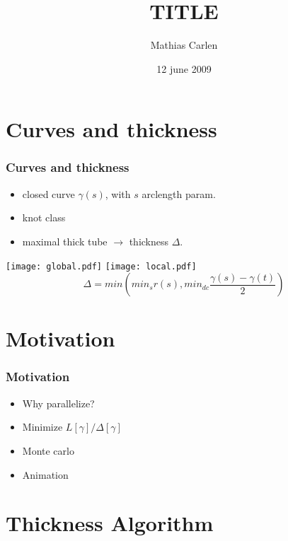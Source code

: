 \documentclass{beamer}
\title{TITLE}
\author{Mathias Carlen}
\date{12 june 2009}
\begin{document}
\frame{\titlepage}


\section{Curves and thickness}

\begin{frame}
\frametitle{Curves and thickness}

\begin{itemize}
 \item<1-> closed curve $\gamma(s)$, with $s$ arclength param.
 \item<2-> knot class
 \item<3-> maximal thick tube $\longrightarrow$ thickness $\Delta$.
\end{itemize}
\vspace{1cm}
\pause
\pause
\pause
\texttt{[image: global.pdf]}\hspace{.2cm}
\pause
\texttt{[image: local.pdf]}
\pause
\[
\Delta = min ( min_s r(s) , min_{dc} \frac{\gamma(s)-\gamma(t)}{2} )
\]
\end{frame}

\section{Motivation}
\begin{frame}
\frametitle{Motivation}
\begin{itemize}
\item<1-> Why parallelize?
\item<2-> Minimize $L[\gamma]/\Delta[\gamma]$
\item<3-> Monte carlo
\item<4-> Animation
\end{itemize}
\end{frame}

\section{Thickness Algorithm}
\end{document}
